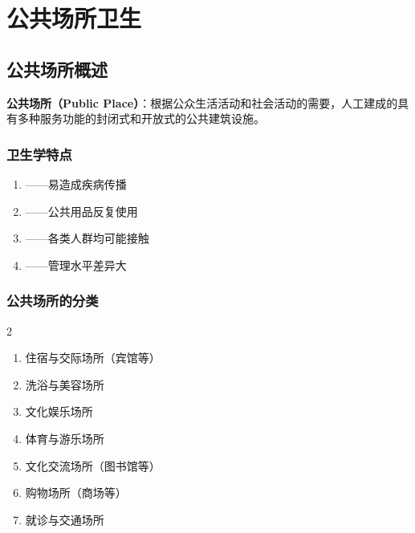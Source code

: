 \chapter{公共场所卫生}
\setcounter{chapter}{10}

\section{公共场所概述}

\begin{defbox}
\textbf{公共场所（Public Place）}：根据公众生活活动和社会活动的需要，人工建成的具有多种服务功能的封闭式和开放式的公共建筑设施。
\end{defbox}

\subsection{卫生学特点}

\begin{enumerate}[leftmargin=*]
    \item {}——易造成疾病传播
    \item {}——公共用品反复使用
    \item {}——各类人群均可能接触
    \item {}——管理水平差异大
\end{enumerate}

\subsection{公共场所的分类}

\begin{multicols}{2}
\begin{enumerate}[leftmargin=*]
    \item 住宿与交际场所（宾馆等）
    \item 洗浴与美容场所
    \item 文化娱乐场所
    \item 体育与游乐场所
    \item 文化交流场所（图书馆等）
    \item 购物场所（商场等）
    \item 就诊与交通场所
\end{enumerate}
\end{multicols}

